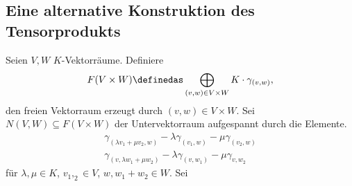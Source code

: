 \subsection*{Eine alternative Konstruktion des Tensorprodukts}
Seien \( V,W \) \( K \)-Vektorräume. Definiere
\begin{equation*}
  F(V\times W)\definedas \bigoplus_{(v,w)\in V\times W}K\cdot \gamma_{(v,w)},
\end{equation*}
den freien Vektorraum erzeugt durch \( (v,w)\in V\times W \). Sei \( N(V,W)\subseteq F(V\times W) \) der Untervektorraum aufgespannt durch die Elemente.  
\begin{gather*}
  \gamma_{(\lambda v_1+\mu v_2,w)}-\lambda \gamma_{(v_1,w)}-\mu \gamma_{(v_2,w)}\\
  \gamma_{(v,\lambda w_1+\mu w_2)}-\lambda \gamma_{(v,w_1)}-\mu \gamma_{v,w_2}
\end{gather*}
für \( \lambda,\mu\in K \), \( v_1,_2\in V \), \( w,w_1+w_2\in W \). Sei
